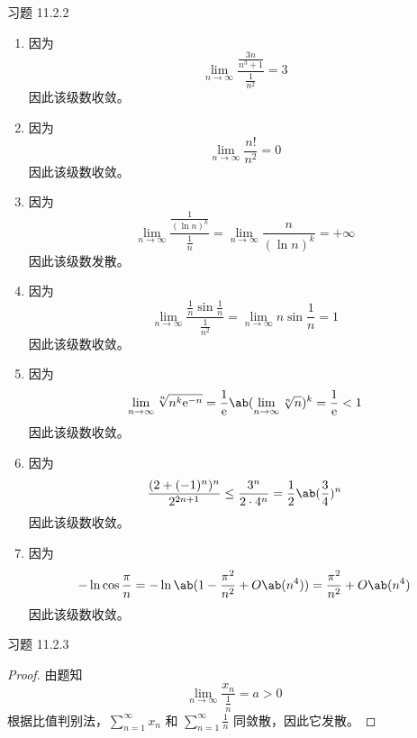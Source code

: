 \begin{problem}
    习题 11.2.2
    \begin{solution}
        \begin{enumerate}
            \item[\textbf{1)}] 因为
            $$
            \lim_{n \to \infty} \frac{\frac{3n}{n^3 + 1}}{\frac{1}{n^2}} = 3
            $$
            因此该级数收敛。

            \item[\textbf{3)}] 因为
            $$
            \lim_{n \to \infty} \frac{n!}{n^2} = 0
            $$
            因此该级数收敛。

            \item[\textbf{5)}] 因为
            $$
            \lim_{n \to \infty} \frac{\frac{1}{(\ln n)^{k}}}{\frac{1}{n}} = \lim_{n \to \infty} \frac{n}{(\ln n)^{k}} = +\infty
            $$
            因此该级数发散。

            \item[\textbf{7)}] 因为
            $$
            \lim_{n \to \infty} \frac{\frac{1}{n} \sin \frac{1}{n}}{\frac{1}{n^2}} = \lim_{n \to \infty} n \sin \frac{1}{n} = 1
            $$
            因此该级数收敛。

            \item[\textbf{9)}] 因为
            $$
            \lim_{n \to \infty} \sqrt[n]{n^{k} \E^{-n}} = \frac{1}{\E} \ab(\lim_{n \to \infty} \sqrt[n]{n})^{k} = \frac{1}{\E} < 1
            $$
            因此该级数收敛。

            \item[\textbf{11)}] 因为
            $$
            \frac{(2 + (-1)^{n})^{n}}{2^{2n + 1}} \le \frac{3^{n}}{2 \cdot 4^n} = \frac{1}{2} \ab(\frac{3}{4})^{n} 
            $$
            因此该级数收敛。

            \item[\textbf{13)}] 因为
            $$
            -\ln \cos \frac{\pi}{n} = -\ln\ab(1 - \frac{\pi^2}{n^2} + O\ab(n^{4})) = \frac{\pi^2}{n^2} + O\ab(n^{4})
            $$
            因此该级数收敛。
        \end{enumerate}
    \end{solution}
\end{problem}

\begin{problem}
    习题 11.2.3
    \begin{proof}
        由题知
        $$
        \lim_{n \to \infty} \frac{x_n}{\frac{1}{n}} = a > 0
        $$
        根据比值判别法，$\sum_{n = 1}^{\infty} x_n$ 和 $\sum_{n = 1}^{\infty} \frac{1}{n}$ 同敛散，因此它发散。
    \end{proof}
\end{problem}

